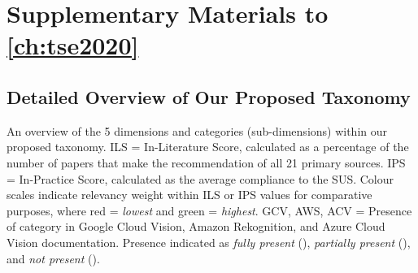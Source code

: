 \chapter{Supplementary Materials to \cref{ch:tse2020}}
\label{ch:tse-supplementary-materials}
\cleardoublepage

\def\circlenotpresent{\faCircleO}
\def\circlepartialpresent{\faAdjust}
\def\circlepresent{\faCircle}

\section{Detailed Overview of Our Proposed Taxonomy}
\label{tse2020:tab:taxonomy}

An overview of the 5 dimensions and categories (sub-dimensions) within our proposed taxonomy. ILS = In-Literature Score, calculated as a percentage of the number of papers that make the recommendation of all 21 primary sources. IPS = In-Practice Score, calculated as the average compliance to the SUS. Colour scales indicate relevancy weight within ILS or IPS values for comparative purposes, where red = \textit{lowest} and green = \textit{highest}. GCV, AWS, ACV = Presence of category in Google Cloud Vision, Amazon Rekognition, and Azure Cloud Vision documentation. Presence indicated as \textit{fully present} (\circlepresent{}), \textit{partially present} (\circlepartialpresent{}), and \textit{not present} (\circlenotpresent{}).

